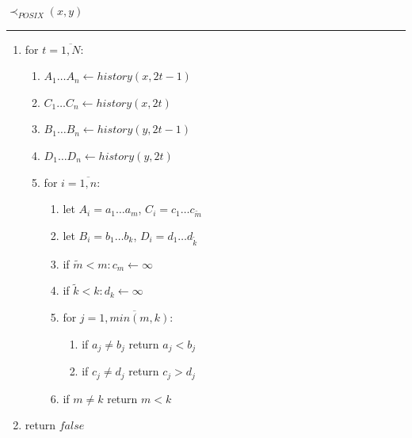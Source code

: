 \documentclass{article}
\newcommand{\Xset}{\!\leftarrow\!}
\newcommand{\Xeq}{\!=\!}
\theoremstyle{definition}
\begin{document}
\begin{multicols}{2}
    $\prec_{POSIX}(x, y)$
    \hrule
    \begin{enumerate}[leftmargin=0in]
        \smallskip
        \item[] for $t \Xeq \overline{1, N}$:
        \begin{enumerate}
            \item[] $A_1 \dots A_n \Xset history(x, 2t \!-\! 1)$
            \item[] $C_1 \dots C_n \Xset history(x, 2t)$
            \item[] $B_1 \dots B_n \Xset history(y, 2t \!-\! 1)$
            \item[] $D_1 \dots D_n \Xset history(y, 2t)$
            \item[] for $i \Xeq \overline{1, n}$:
            \begin{enumerate}
                \item[] let $A_i \Xeq a_1 \dots a_m$, $C_i \Xeq c_1 \dots c_{\widetilde{m}}$
                \item[] let $B_i \Xeq b_1 \dots b_k$, $D_i \Xeq d_1 \dots d_{\widetilde{k}}$
                \item[] if $\widetilde{m} \!<\! m: c_m \Xset \infty$
                \item[] if $\widetilde{k} \!<\! k: d_k \Xset \infty$
                \item[] for $j \Xeq \overline{1, min(m, k)}$:
                \begin{enumerate}
                    \item[] if $a_j \!\neq\! b_j$ return $a_j \!<\! b_j$
                    \item[] if $c_j \!\neq\! d_j$ return $c_j \!>\! d_j$
                \end{enumerate}
                \item[] if $m \!\neq\! k$ return $m \!<\! k$
            \end{enumerate}
        \end{enumerate}
        \item[] return $false$
        \\
    \end{enumerate}

    \bigskip


\end{multicols}
\end{document}
